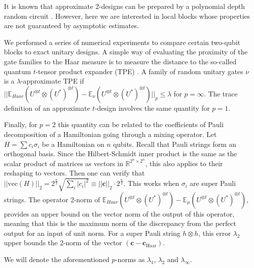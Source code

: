 It is known that approximate 2-designs can be prepared by a polynomial depth random circuit \cite{harrow_approximate_2018,brandao_local_2016}. However, here we are interested in local blocks whose properties are not guaranteed by asymptotic estimates.

We performed a series of numerical experiments to compare certain two-qubit blocks to exact unitary designs. A simple way of evaluating the proximity of the gate families to the Haar measure is to measure the distance to the so-called quantum $t$-tensor product expander (TPE) \cite{brandao_local_2016,low_pseudo-randomness_2010}. A family of random unitary gates $\nu$ is a $\lambda$-approximate TPE if $||\mathbb{E}_{Haar} (U^{\otimes t} \otimes (U^*)^{\otimes t}) - \mathbb{E}_\nu (U^{\otimes t} \otimes (U^*)^{\otimes t}) ||_p \leq \lambda$ for $p=\infty$. 
The trace definition of an approximate $t$-design involves the same quantity for $p = 1$. 

Finally, for $p=2$ this quantity can be related to the coefficients of Pauli decomposition of a Hamiltonian going through a mixing operator.  Let $H = \sum c_i \sigma_i$ be a Hamiltonian on $n$ qubits. Recall that Pauli strings form an orthogonal basis. Since the Hilbert-Schmidt inner product is the same as the scalar product of matrices as vectors in $\mathbb{R}^{2^n \times 2^n}$, this also applies to their reshaping to vectors. Then one can verify that $||\mathrm{vec}(H)||_2 = 
2^{\frac{n}{2}} \sqrt{\sum_i |c_i|^2}
\equiv ||\mathbf{c}||_2 \cdot 2^{\frac{n}{2}}$. This works when $\sigma_i$ are super Pauli strings. The operator 2-norm of $\mathbb{E}_{Haar} (U^{\otimes t} \otimes (U^*)^{\otimes t}) - \mathbb{E}_{\mu} (U^{\otimes t} \otimes (U^*)^{\otimes t})$, provides an upper bound on the vector norm of the output of this operator, meaning that this is the maximum norm of the discrepancy from the perfect output for an input of unit norm. For a super Pauli string $h \otimes h$, this error $\lambda_2$ upper bounds the 2-norm of the vector $(\mathbf{c} - \mathbf{c}_{\text{Haar}})$.

We will denote the aforementioned $p$-norms as $\lambda_1$, $\lambda_2$ and $\lambda_\infty$. 


